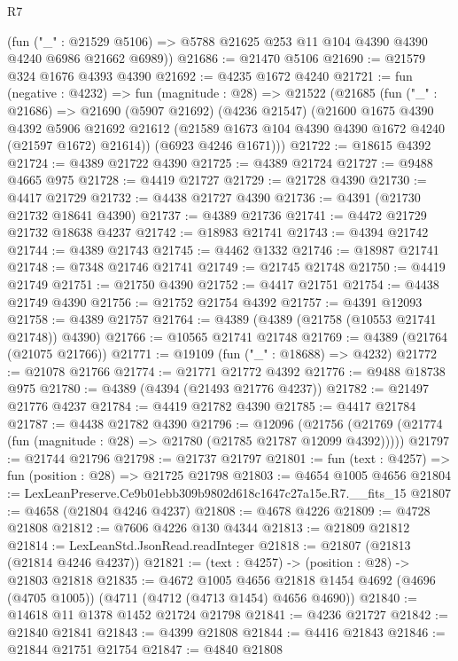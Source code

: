 \begin{lexlean}{R7}
\begin{coremodule}
      (fun ("_" : @21529 @5106) => @5788 @21625 @253 @11 @104 @4390 @4390 @4240 @6986 @21662 @6989))
@21686 := @21470 @5106
@21690 := @21579 @324 @1676 @4393 @4390
@21692 := @4235 @1672 @4240
@21721 := fun (negative : @4232) =>
  fun (magnitude : @28) =>
  @21522
    (@21685
      (fun ("_" : @21686) =>
      @21690
        (@5907 @21692)
        (@4236 @21547)
        (@21600
          @1675
          @4390
          @4392
          @5906
          @21692
          @21612
          (@21589 @1673 @104 @4390 @4390 @1672 @4240 (@21597 @1672) @21614))
        (@6923 @4246 @1671)))
@21722 := @18615 @4392
@21724 := @4389 @21722 @4390
@21725 := @4389 @21724
@21727 := @9488 @4665 @975
@21728 := @4419 @21727
@21729 := @21728 @4390
@21730 := @4417 @21729
@21732 := @4438 @21727 @4390
@21736 := @4391 (@21730 @21732 @18641 @4390)
@21737 := @4389 @21736
@21741 := @4472 @21729 @21732 @18638 @4237
@21742 := @18983 @21741
@21743 := @4394 @21742
@21744 := @4389 @21743
@21745 := @4462 @1332
@21746 := @18987 @21741
@21748 := @7348 @21746 @21741
@21749 := @21745 @21748
@21750 := @4419 @21749
@21751 := @21750 @4390
@21752 := @4417 @21751
@21754 := @4438 @21749 @4390
@21756 := @21752 @21754 @4392
@21757 := @4391 @12093
@21758 := @4389 @21757
@21764 := @4389 (@4389 (@21758 (@10553 @21741 @21748)) @4390)
@21766 := @10565 @21741 @21748
@21769 := @4389 (@21764 (@21075 @21766))
@21771 := @19109 (fun ("_" : @18688) => @4232)
@21772 := @21078 @21766
@21774 := @21771 @21772 @4392
@21776 := @9488 @18738 @975
@21780 := @4389 (@4394 (@21493 @21776 @4237))
@21782 := @21497 @21776 @4237
@21784 := @4419 @21782 @4390
@21785 := @4417 @21784
@21787 := @4438 @21782 @4390
@21796 := @12096
    (@21756 (@21769 (@21774 (fun (magnitude : @28) => @21780 (@21785 @21787 @12099 @4392)))))
@21797 := @21744 @21796
@21798 := @21737 @21797
@21801 := fun (text : @4257) => fun (position : @28) => @21725 @21798
@21803 := @4654 @1005 @4656
@21804 := LexLeanPreserve.Ce9b01ebb309b9802d618c1647c27a15e.R7.__fits_15
@21807 := @4658 (@21804 @4246 @4237)
@21808 := @4678 @4226
@21809 := @4728 @21808
@21812 := @7606 @4226 @130 @4344
@21813 := @21809 @21812
@21814 := LexLeanStd.JsonRead.readInteger
@21818 := @21807 (@21813 (@21814 @4246 @4237))
@21821 := (text : @4257) -> (position : @28) -> @21803 @21818
@21835 := @4672
    @1005
    @4656
    @21818
    @1454
    @4692
    (@4696 (@4705 @1005))
    (@4711 (@4712 (@4713 @1454) @4656 @4690))
@21840 := @14618 @11 @1378 @1452 @21724 @21798
@21841 := @4236 @21727
@21842 := @21840 @21841
@21843 := @4399 @21808
@21844 := @4416 @21843
@21846 := @21844 @21751 @21754
@21847 := @4840 @21808

\end{coremodule}
\end{lexlean}
